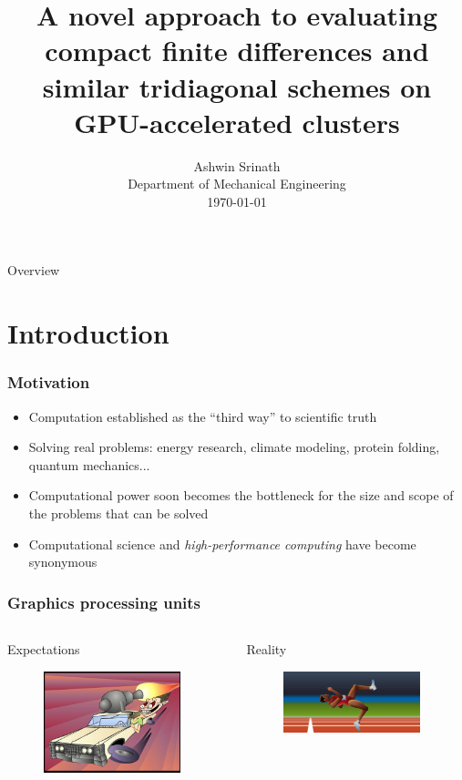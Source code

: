 \documentclass{beamer}
\begin{document}
\title[Compact finite differences on GPUs]
{A novel approach to evaluating 
compact finite differences 
and similar tridiagonal schemes on GPU-accelerated clusters}

\author[Ashwin Srinath]{
        Ashwin Srinath\\
        Department of Mechanical Engineering\\
        \today}
\date{}
\titlepage

\begin{frame}{Overview}
    \tableofcontents
\end{frame}

\section{Introduction}
\begin{frame}
\frametitle{Motivation}
\begin{itemize}[<+->]
    \item Computation established as the ``third way''
        to scientific truth
    \item Solving real problems:
        energy research,
        climate modeling,
        protein folding,
        quantum mechanics...
    \item Computational power soon becomes the bottleneck
        for the size and scope of the problems that can
        be solved
    \item Computational science and
        \emph{high-performance computing} have become
        synonymous
\end{itemize}
\end{frame}

\begin{frame}
\frametitle{Graphics processing units}
\begin{columns}[c]
     \begin{column}[T]{5cm}
        Expectations
        \begin{figure}
        \includegraphics[width=150px]{img/expectations.jpg}
        \end{figure}
    \end{column}

    \begin{column}[T]{5cm}
        Reality
        \begin{figure}
        \includegraphics[width=150px]{img/reality.png}
        \end{figure}
    \end{column}
\end{columns}
\end{frame}
\end{document}
